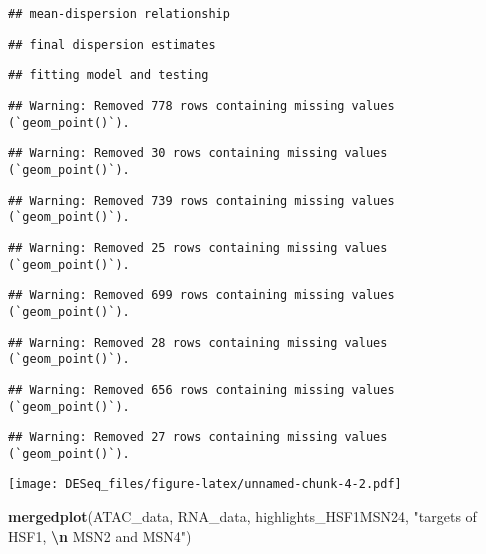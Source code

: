 \documentclass[
]{article}
\newenvironment{Shaded}{\begin{snugshade}}{\end{snugshade}}
\newcommand{\FunctionTok}[1]{\textcolor[rgb]{0.13,0.29,0.53}{\textbf{#1}}}
\newcommand{\NormalTok}[1]{#1}
\newcommand{\SpecialCharTok}[1]{\textcolor[rgb]{0.81,0.36,0.00}{\textbf{#1}}}
\newcommand{\StringTok}[1]{\textcolor[rgb]{0.31,0.60,0.02}{#1}}
\begin{document}
\begin{verbatim}
## mean-dispersion relationship
\end{verbatim}

\begin{verbatim}
## final dispersion estimates
\end{verbatim}

\begin{verbatim}
## fitting model and testing
\end{verbatim}

\begin{verbatim}
## Warning: Removed 778 rows containing missing values (`geom_point()`).
\end{verbatim}

\begin{verbatim}
## Warning: Removed 30 rows containing missing values (`geom_point()`).
\end{verbatim}

\begin{verbatim}
## Warning: Removed 739 rows containing missing values (`geom_point()`).
\end{verbatim}

\begin{verbatim}
## Warning: Removed 25 rows containing missing values (`geom_point()`).
\end{verbatim}

\begin{verbatim}
## Warning: Removed 699 rows containing missing values (`geom_point()`).
\end{verbatim}

\begin{verbatim}
## Warning: Removed 28 rows containing missing values (`geom_point()`).
\end{verbatim}

\begin{verbatim}
## Warning: Removed 656 rows containing missing values (`geom_point()`).
\end{verbatim}

\begin{verbatim}
## Warning: Removed 27 rows containing missing values (`geom_point()`).
\end{verbatim}

\texttt{[image: DESeq\_files/figure-latex/unnamed-chunk-4-2.pdf]}

\begin{Shaded}
\begin{Highlighting}[]
\FunctionTok{mergedplot}\NormalTok{(ATAC\_data, RNA\_data, highlights\_HSF1MSN24, }\StringTok{"targets of HSF1, }\SpecialCharTok{\textbackslash{}n}\StringTok{ MSN2 and MSN4"}\NormalTok{)}
\end{Highlighting}
\end{Shaded}
\end{document}
